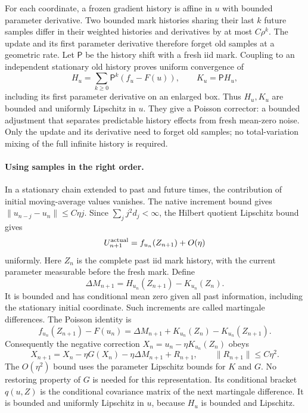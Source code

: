 For each coordinate, a frozen gradient history is affine in $u$ with bounded
parameter derivative. Two bounded mark histories sharing their last $k$
future samples differ in their weighted histories and derivatives by at
most $C\rho^k$. The update and its first parameter derivative therefore forget old
samples at a geometric rate. Let $\mathsf P$ be the history
shift with a fresh iid mark. Coupling to an independent stationary old
history proves uniform convergence of
\[
 H_u=\sum_{k\geq0}\mathsf P^k(f_u-F(u)),\qquad K_u=\mathsf P H_u,
\]
including its first parameter derivative on an enlarged box. Thus $H_u,K_u$
are bounded and uniformly Lipschitz in $u$. They give a Poisson corrector:
a bounded adjustment that separates predictable history effects from
fresh mean-zero noise. Only the update and its derivative need to forget
old samples; no total-variation mixing of the full infinite history is
required.

\paragraph{Using samples in the right order.}
In a stationary chain extended to past and future times, the contribution
of initial moving-average values vanishes.
The native increment bound gives $\|u_{n-j}-u_n\|\leq C\eta j$.
Since $\sum_jj^2d_j<\infty$, the Hilbert quotient Lipschitz bound gives
\[
 U_{n+1}^{\rm actual}=f_{u_n}(Z_{n+1})+O(\eta)
\]
uniformly. Here $Z_n$ is the complete past iid mark history, with the
current parameter measurable before the fresh mark. Define
\[
 \Delta M_{n+1}=H_{u_n}(Z_{n+1})-K_{u_n}(Z_n).
\]
It is bounded and has conditional mean zero given all past information,
including the stationary initial coordinate. Such increments are called
martingale differences. The Poisson identity is
\[
 f_{u_n}(Z_{n+1})-F(u_n)
 =\Delta M_{n+1}+K_{u_n}(Z_n)-K_{u_n}(Z_{n+1}).
\]
Consequently the negative correction $X_n=u_n-\eta K_{u_n}(Z_n)$ obeys
\begin{equation}\label{eq:corrected-core}
 X_{n+1}=X_n-\eta G(X_n)-\eta\Delta M_{n+1}+R_{n+1},
 \qquad \|R_{n+1}\|\leq C\eta^2.
\end{equation}
The $O(\eta^2)$ bound uses the parameter Lipschitz bounds for $K$ and $G$.
No restoring property of $G$ is needed for this representation. Its
conditional bracket $q(u,Z)$ is the conditional covariance matrix of the
next martingale difference. It is bounded and uniformly Lipschitz in $u$,
because $H_u$ is bounded and Lipschitz.

